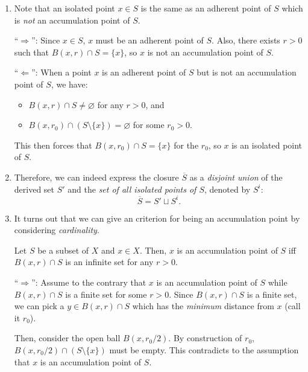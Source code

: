 \begin{enumerate}
\item \label{it:isolated-point-equiv-def} Note that an isolated point \(x\in
S\) is the same as an adherent point of \(S\) which is \emph{not} an
accumulation point of \(S\).

\begin{pf}
``\(\Rightarrow\)'': Since \(x\in S\), \(x\) must be an adherent point of
\(S\). Also, there exists \(r>0\) such that \(B(x,r)\cap S=\{x\}\), so \(x\) is
not an accumulation point of \(S\).

``\(\Leftarrow\)'': When a point \(x\) is an adherent point of \(S\) but is not
an accumulation point of \(S\), we have:
\begin{itemize}
\item \(B(x,r)\cap S\ne\varnothing\) for any \(r>0\), and
\item \(B(x,r_0)\cap (S\setminus\{x\})=\varnothing\) for some \(r_0>0\).
\end{itemize}
This then forces that \(B(x,r_0)\cap S=\{x\}\) for the \(r_0\), so \(x\) is an
isolated point of \(S\).
\end{pf}

\item\label{it:closure-decompose-acc-isolate} Therefore, we can indeed express
the closure \(\overline{S}\) as a \emph{disjoint union} of the derived set
\(S'\) and the \emph{set of all isolated points of \(S\)}, denoted by \(S^i\):
\[
\overline{S}=S'\sqcup S^{i}.
\]

\item It turns out that we can give an criterion for being an
accumulation point by considering \emph{cardinality}.
\begin{proposition}
\label{prp:acc-pt-inf-set}
Let \(S\) be a subset of \(X\) and \(x\in X\). Then, \(x\) is an accumulation
point of \(S\) iff \(B(x,r)\cap S\) is an infinite set for any \(r>0\).
\end{proposition}
\begin{pf}
``\(\Rightarrow\)'': Assume to the contrary that \(x\) is an accumulation point
of \(S\) while \(B(x,r)\cap S\) is a finite set for some \(r>0\). Since
\(B(x,r)\cap S\) is a finite set, we can pick a \(y\in B(x,r)\cap S\) which has
the \emph{minimum} distance from \(x\) (call it \(r_0\)).

Then, consider the open ball \(B(x,r_0/2)\). By construction of \(r_0\),
\(B(x,r_0/2)\cap (S\setminus\{x\})\) must be empty. This contradicts to the
assumption that \(x\) is an accumulation point of \(S\).


\end{pf}
\end{enumerate}
